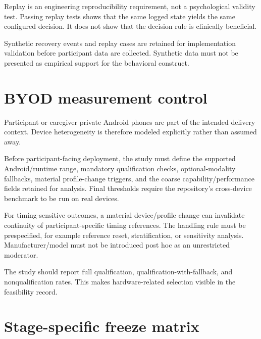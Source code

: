 \documentclass[man]{apa7}
\begin{document}
Replay is an engineering reproducibility requirement, not a psychological validity test. Passing replay tests shows that the same logged state yields the same configured decision. It does not show that the decision rule is clinically beneficial.

Synthetic recovery events and replay cases are retained for implementation validation before participant data are collected. Synthetic data must not be presented as empirical support for the behavioral construct.

\section{BYOD measurement control}

Participant or caregiver private Android phones are part of the intended delivery context. Device heterogeneity is therefore modeled explicitly rather than assumed away.

Before participant-facing deployment, the study must define the supported Android/runtime range, mandatory qualification checks, optional-modality fallbacks, material profile-change triggers, and the coarse capability/performance fields retained for analysis. Final thresholds require the repository's cross-device benchmark to be run on real devices.

For timing-sensitive outcomes, a material device/profile change can invalidate continuity of participant-specific timing references. The handling rule must be prespecified, for example reference reset, stratification, or sensitivity analysis. Manufacturer/model must not be introduced post hoc as an unrestricted moderator.

The study should report full qualification, qualification-with-fallback, and nonqualification rates. This makes hardware-related selection visible in the feasibility record.

\section{Stage-specific freeze matrix}
\end{document}

